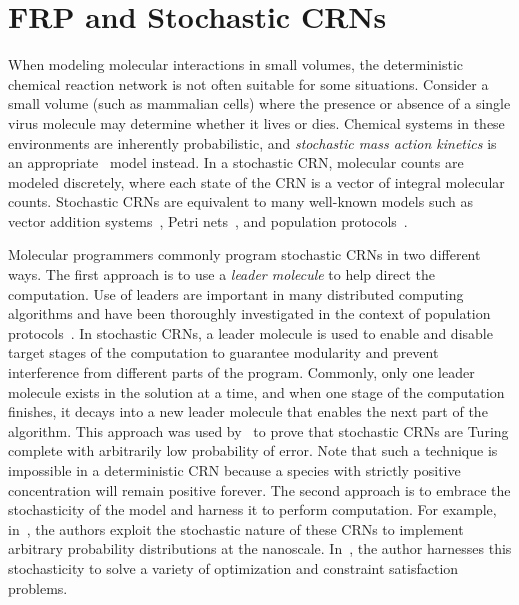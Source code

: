 
\section{FRP and Stochastic CRNs}
\label{sec:frp_scrns}

When modeling molecular interactions in small volumes, the deterministic chemical reaction network is not often suitable for some situations.
Consider a small volume (such as mammalian cells) where the presence or absence of a single virus molecule may determine whether it lives or dies.
Chemical systems in these environments are inherently probabilistic, and \emph{stochastic mass action kinetics} is an appropriate~\cite{jGill77,oCSWB09} model instead.
In a stochastic CRN, molecular counts are modeled discretely, where each state of the CRN is a vector of integral molecular counts.
Stochastic CRNs are equivalent to many well-known models such as vector addition systems~\cite{oGins66,jKaMiWi67,jKarMil69,jNash73,jLero10,cLero12}, Petri nets~\cite{oPetr62,jMura89,oDavAll10,oReis13}, and population protocols~\cite{jAADFP06,jAAER07,jAnAsEi08,jAnAsEi08a,Doty2018}.

Molecular programmers commonly program stochastic CRNs in two different ways.
The first approach is to use a \emph{leader molecule} to help direct the computation.
Use of leaders are important in many distributed computing algorithms and have been thoroughly investigated in the context of population protocols~\cite{jAnAsEi08,Doty2018}.
In stochastic CRNs, a leader molecule is used to enable and disable target stages of the computation to guarantee modularity and prevent interference from different parts of the program.
Commonly, only one leader molecule exists in the solution at a time, and when one stage of the computation finishes, it decays into a new leader molecule that enables the next part of the algorithm.
This approach was used by~\cite{jSCWB08} to prove that stochastic CRNs are Turing complete with arbitrarily low probability of error.
Note that such a technique is impossible in a deterministic CRN because a species with strictly positive concentration will remain positive forever.
The second approach is to embrace the stochasticity of the model and harness it to perform computation.
For example, in~\cite{CAPPELLETTI202064}, the authors exploit the stochastic nature of these CRNs to implement arbitrary probability distributions at the nanoscale.
In~\cite{cWinfe19}, the author harnesses this stochasticity to solve a variety of optimization and constraint satisfaction problems.

